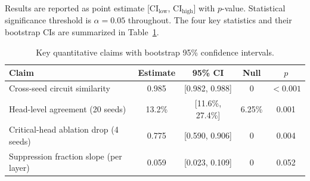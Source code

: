 Results are reported as point estimate [CI$_{\text{low}}$, CI$_{\text{high}}$] with $p$-value.
Statistical significance threshold is $\alpha = 0.05$ throughout. The four key statistics and
their bootstrap CIs are summarized in Table~\ref{tab:statistics}.

\begin{table}[h]
\centering
\caption{Key quantitative claims with bootstrap 95\% confidence intervals.}
\label{tab:statistics}
\begin{tabular}{lcccc}
\toprule
Claim & Estimate & 95\% CI & Null & $p$ \\
\midrule
Cross-seed circuit similarity & 0.985 & [0.982, 0.988] & 0 & $<0.001$ \\
Head-level agreement (20 seeds) & 13.2\% & [11.6\%, 27.4\%] & 6.25\% & 0.001 \\
Critical-head ablation drop (4 seeds) & 0.775 & [0.590, 0.906] & 0 & 0.004 \\
Suppression fraction slope (per layer) & 0.059 & [0.023, 0.109] & 0 & 0.052 \\
\bottomrule
\end{tabular}
\end{table}
